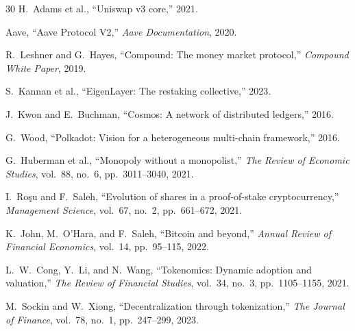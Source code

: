 \documentclass[11pt,a4paper]{article}
\begin{document}
\begin{thebibliography}{30}
H.~Adams et al., ``Uniswap v3 core,'' 2021.

Aave, ``Aave Protocol V2,'' \emph{Aave Documentation}, 2020.

R.~Leshner and G.~Hayes, ``Compound: The money market protocol,'' \emph{Compound White Paper}, 2019.

S.~Kannan et al., ``EigenLayer: The restaking collective,'' 2023.

J.~Kwon and E.~Buchman, ``Cosmos: A network of distributed ledgers,'' 2016.

G.~Wood, ``Polkadot: Vision for a heterogeneous multi-chain framework,'' 2016.

G.~Huberman et al., ``Monopoly without a monopolist,'' \emph{The Review of Economic Studies}, vol.~88, no.~6, pp.~3011--3040, 2021.

I.~Ro\c{s}u and F.~Saleh, ``Evolution of shares in a proof-of-stake cryptocurrency,'' \emph{Management Science}, vol.~67, no.~2, pp.~661--672, 2021.

K.~John, M.~O'Hara, and F.~Saleh, ``Bitcoin and beyond,'' \emph{Annual Review of Financial Economics}, vol.~14, pp.~95--115, 2022.

L.~W.~Cong, Y.~Li, and N.~Wang, ``Tokenomics: Dynamic adoption and valuation,'' \emph{The Review of Financial Studies}, vol.~34, no.~3, pp.~1105--1155, 2021.

M.~Sockin and W.~Xiong, ``Decentralization through tokenization,'' \emph{The Journal of Finance}, vol.~78, no.~1, pp.~247--299, 2023.

\end{thebibliography}
\end{document}
